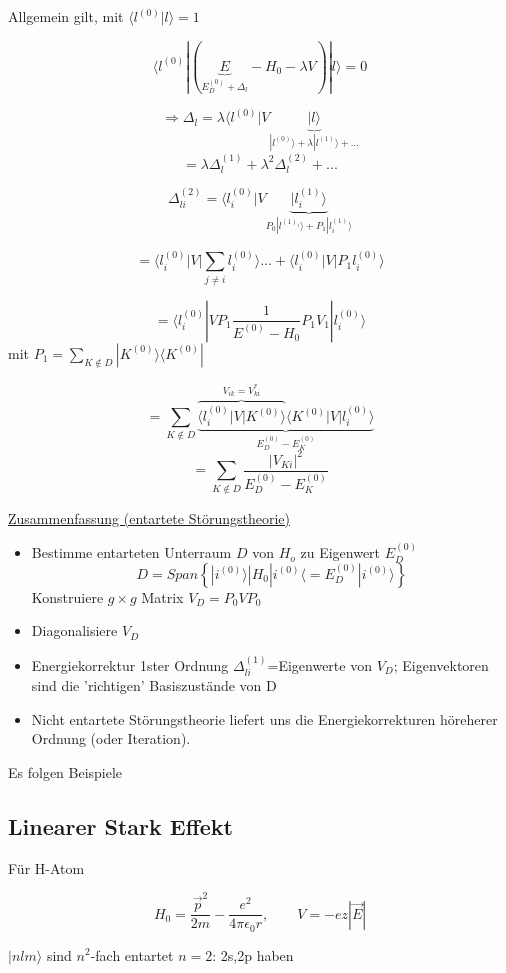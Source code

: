 Allgemein gilt, mit \(\langle l^{(0)} |l\rangle = 1\)

\[ \langle l^{(0)}|(\underbrace{E}_{E^{(0)}_D+\Delta_l}-H_0-\lambda V) |l\rangle = 0 \]

\[ \Rightarrow \Delta_l = \lambda \langle l^{(0)}| V \underbrace{|l\rangle}_{|l^{(0)}\rangle+\lambda|l^{(1)}\rangle+...}\]
\[ =\lambda \Delta^{(1)}_l+\lambda^2\Delta^{(2)}_l+...\]


\[  \Delta^{(2)}_{li} = \langle l^{(0)}_i| V \underbrace{|l^{(1)}_i\rangle}_{P_0|l^{(1)_i}\rangle+P_1|l^{(1)}_i\rangle}\]

\[ = \langle l^{(0)}_i| V |\sum_{j\neq i}l^{(0)}_i\rangle ...+\langle l^{(0)}_i|  V |P_1 l^{(0)}_i\rangle\]

\[ = \langle l^{(0)}_i| V P_1 \frac{1}{E^{(0)}-H_0} P_1V_1|l^{(0)}_i\rangle\]
mit \(P_1 = \sum_{K\notin D}|K^{(0)}\rangle\langle K^{(0)}|\)

\[ =  \sum_{K\notin D}\underbrace{\overbrace{\langle l^{(0)}_i| V | K^{(0)}\rangle}^{V_{ik}=V^*_{ki}}\langle K^{(0)}| V | l^{(0)}_i\rangle}_{E^{(0)}_D-E^{(0)}_K}\]
\[ =  \sum_{K\notin D} \frac{|V_{Ki}|^2}{E^{(0)}_D-E^{(0)}_K}\]


\underline{Zusammenfassung (entartete Störungstheorie)}


\begin{itemize}
\item Bestimme entarteten Unterraum \(D\) von \(H_o\) zu Eigenwert \(E^{(0)}_D\)
\[ D = Span\left\{ |i^{(0)}\rangle | H_0|i^{(0)}\langle = E^{(0)}_D |i^{(0)}\rangle \right\}\]
Konstruiere \(g\times g\) Matrix \(V_D = P_0VP_0\)
\item Diagonalisiere \(V_D\)
\item Energiekorrektur 1ster Ordnung \(\Delta^{(1)}_{li}\)=Eigenwerte von \(V_D\); Eigenvektoren sind die 'richtigen' Basiszustände von D
\item Nicht entartete Störungstheorie liefert uns die Energiekorrekturen höreherer Ordnung (oder Iteration).
\end{itemize}

Es folgen Beispiele
\subsection{Linearer Stark Effekt}
Für H-Atom

\[ H_0 = \frac{\vec p^2}{2m}-\frac{e^2}{4\pi\epsilon_0 r}, \qquad V=-ez|\vec E|\]

\(|nlm\rangle\) sind \(n^2\)-fach entartet \(n=2\): 2s,2p haben

